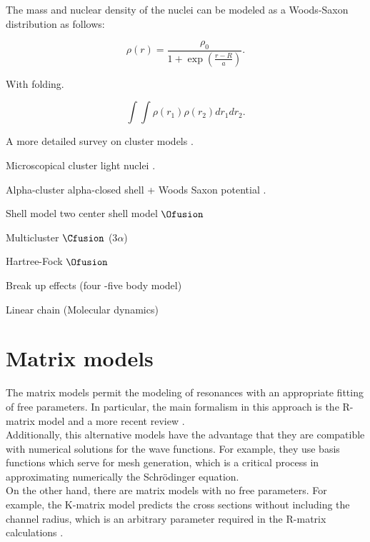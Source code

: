 \documentclass[openany]{book}
\begin{document}
The mass and nuclear density of the nuclei can be modeled as a Woods-Saxon distribution as follows:

\begin{equation} \label{eq:micro_density}
	\rho(r) = \frac{\rho_0}{1 + \exp{\left(\frac{r - R}{a}\right)}}.
\end{equation} 

With folding.

\begin{equation}  \label{eq:micro_folding}
	\int \int \rho(r_1) \rho(r_2) dr_1 dr_2. 
\end{equation}


A more detailed survey on cluster models \cite{beck_2012}.

Microscopical cluster light nuclei \cite{freer_horiuchi_kanada-enyo_lee_meisner_2018}.

Alpha-cluster alpha-closed shell + Woods Saxon potential  \cite{bai_ren_2018}.

Shell model \cite{dong_wang_michel_ploszajczak_2022} two center shell model $\Ofusion$ \cite{tazawa_1974}

Multicluster $\Cfusion$ (3$\alpha$) \cite{dufour_descouvemont_1997}

Hartree-Fock $\Ofusion$ \cite{simenel_keser_umar_oberacker_2013}

Break up effects (four -five body model)\cite{shubhchintak_descouvemont_2022}

Linear chain (Molecular dynamics) \cite{baba_taniguchi_kimura_2022}

\section{Matrix models}  \label{sec:matrixModels}

The matrix models permit the modeling of resonances with an appropriate fitting of free parameters. In particular, the main formalism in this approach is the R-matrix model \cite{lane_thomas_1958} and a more recent review \cite{descouvemont_baye_2010}. \\

Additionally, this alternative models have the advantage that they are compatible with numerical solutions for the wave functions. For example, they use basis functions which serve for mesh generation, which is a critical process in approximating numerically the Schrödinger equation. \\

On the other hand, there are matrix models with no free parameters. For example, the K-matrix model predicts the cross sections without including the channel radius, which is an arbitrary parameter required in the R-matrix calculations \cite{humblet_1990}. \\
\end{document}
